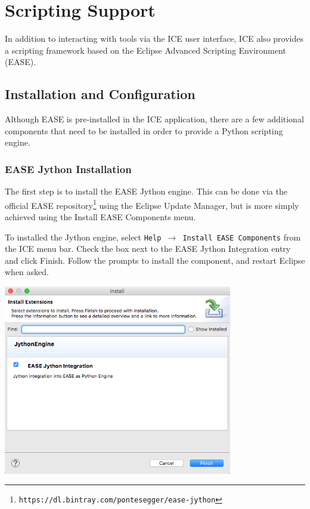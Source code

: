 \chapter{Scripting Support}
In addition to interacting with tools via the ICE user interface, ICE also
provides a scripting framework based on the Eclipse Advanced Scripting
Environment (EASE). 

\section{Installation and Configuration}

Although EASE is pre-installed in the ICE application, there are a few
additional components that need to be installed in order to provide a Python
scripting engine.

\subsection{EASE Jython Installation} 

The first step is to install the EASE Jython engine. This can be done via the
official EASE
repository\footnote{\texttt{https://dl.bintray.com/pontesegger/ease-jython}}
using the Eclipse Update Manager, but is more simply achieved using the Install EASE Components menu.

To installed the Jython engine, select \texttt{Help $\rightarrow$ Install
EASE Components} from the ICE menu bar. Check the box next to the EASE Jython
Integration entry and click Finish. Follow the prompts to install the component,
and restart Eclipse when asked.
\begin{center}
\includegraphics[width=10cm]{images/ease-marketplace}
\end{center}

